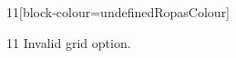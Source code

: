 \documentclass[paper=A4]{ropas-poster}
\begin{document}
\begin{postergrid}{1}{1}[block-colour=undefinedRopasColour]
\begin{posterblock}{1}{1}
Invalid grid option.
\end{posterblock}
\end{postergrid}
\end{document}
